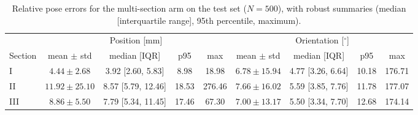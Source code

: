 \begin{table}[h]
\centering
\caption{Relative pose errors for the multi-section arm on the test set ($N = 500$), with robust summaries (median [interquartile range], 95th percentile, maximum).}
\label{tab:S6}
\begin{tabular}{lcccc|cccc}
\toprule
 & \multicolumn{4}{c|}{Position [mm]} & \multicolumn{4}{c}{Orientation [$^\circ$]} \\
Section & mean $\pm$ std & median [IQR] & p95 & max & mean $\pm$ std & median [IQR] & p95 & max \\
\midrule
I & $4.44 \pm 2.68$ & 3.92 [2.60, 5.83] & 8.98 & 18.98 & $6.78 \pm 15.94$ & 4.77 [3.26, 6.64] & 10.18 & 176.71 \\
II & $11.92 \pm 25.10$ & 8.57 [5.79, 12.46] & 18.53 & 276.46 & $7.66 \pm 16.02$ & 5.59 [3.85, 7.76] & 11.78 & 177.07 \\
III & $8.86 \pm 5.50$ & 7.79 [5.34, 11.45] & 17.46 & 67.30 & $7.00 \pm 13.17$ & 5.50 [3.34, 7.70] & 12.68 & 174.14 \\
\bottomrule
\end{tabular}
\end{table}
